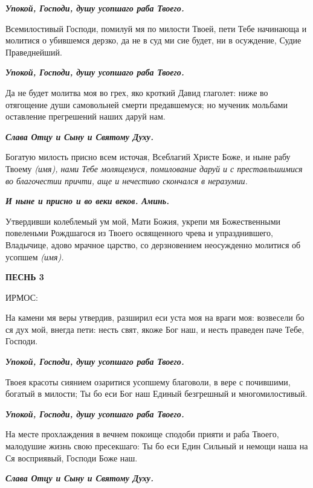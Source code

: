 \itshape \bfseries Упокой, Господи, душу усопшаго раба Твоего.\normalfont{}\normalfont{}


Всемилостивый Господи, помилуй мя по милости Твоей, пети Тебе начинающа и молитися о убившемся дерзко, да не в суд ми сие будет, ни в осуждение, Судие Праведнейший.


\itshape \bfseries Упокой, Господи, душу усопшаго раба Твоего.\normalfont{}\normalfont{}


Да не будет молитва моя во грех, яко кроткий Давид глаголет: ниже во отягощение души самовольней смерти предавшемуся; но мученик мольбами оставление прегрешений наших даруй нам.


\itshape \bfseries Слава Отцу и Сыну и Святому Духу.\normalfont{}\normalfont{}


Богатую милость присно всем источая, Всеблагий Христе Боже, и ныне рабу Твоему \itshape (имя)\normalfont{}, нами Тебе молящемуся, помилование даруй и с преставльшимися во благочестии причти, аще и нечестиво скончался в неразумии.


\itshape \bfseries И ныне и присно и во веки веков. Аминь.\normalfont{}\normalfont{}


Утвердивши колеблемый ум мой, Мати Божия, укрепи мя Божественными повеленьми Рождшагося из Твоего освященного чрева и упразднившего, Владычице, адово мрачное царство, со дерзновением неосужденно молитися об усопшем \itshape (имя)\normalfont{}. 


\bfseries ПЕСНЬ 3


ИРМОС:\normalfont{}


На камени мя веры утвердив, разширил еси уста моя на враги моя: возвесели бо ся дух мой, внегда пети: несть свят, якоже Бог наш, и несть праведен паче Тебе, Господи.


\itshape \bfseries Упокой, Господи, душу усопшаго раба Твоего.\normalfont{}\normalfont{}


Твоея красоты сиянием озаритися усопшему благоволи, в вере с почившими, богатый в милости; Ты бо еси Бог наш Единый безгрешный и многомилостивый.


\itshape \bfseries Упокой, Господи, душу усопшаго раба Твоего.\normalfont{}\normalfont{}


На месте прохлаждения в вечнем покоище сподоби прияти и раба Твоего, малодушие жизнь свою пресекшаго: Ты бо еси Един Сильный и немощи наша на Ся восприявый, Господи Боже наш.


\itshape \bfseries Слава Отцу и Сыну и Святому Духу.\normalfont{}\normalfont{}


